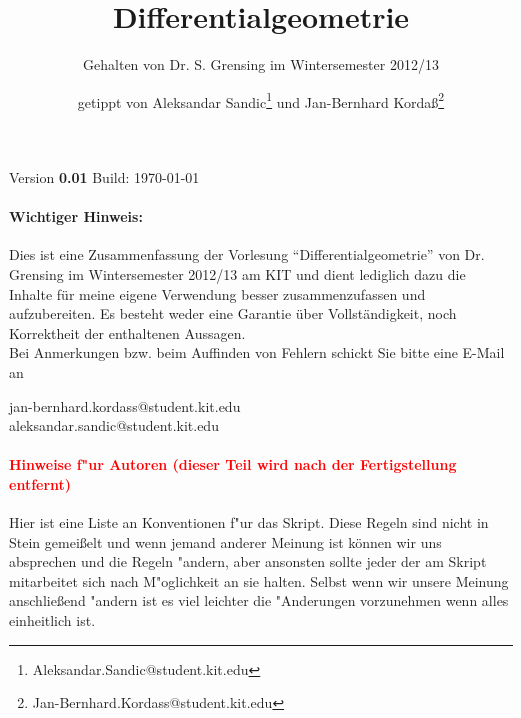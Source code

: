 \documentclass[paper=A4, twoside, chapterprefix=true, bibliography=totoc, headsepline]{scrbook}
\title{Differentialgeometrie}
\subtitle{Gehalten von Dr. S. Grensing im Wintersemester 2012/13}
\author{getippt von Aleksandar Sandic\thanks{Aleksandar.Sandic@student.kit.edu} und Jan-Bernhard Korda\ss\thanks{Jan-Bernhard.Kordass@student.kit.edu}}
\begin{document}

\maketitle

\setlength\parskip{0.6pt}
\tableofcontents

\setlength\parskip{\smallskipamount}

\vspace{0.5cm}

Version \textbf{0.01} \quad Build: \today

\paragraph{Wichtiger Hinweis:}
Dies ist eine Zusammenfassung der Vorlesung "`Differentialgeometrie"' von Dr. Grensing im Wintersemester 2012/13 am KIT und dient lediglich dazu die Inhalte für meine eigene Verwendung besser zusammenzufassen und aufzubereiten. Es besteht weder eine Garantie über Vollständigkeit, noch Korrektheit der enthaltenen Aussagen.\\

Bei Anmerkungen bzw. beim Auffinden von Fehlern schickt Sie bitte eine E-Mail an
\begin{center}
  jan-bernhard.kordass@student.kit.edu\\
  aleksandar.sandic@student.kit.edu
\end{center}

\paragraph{\textcolor{red}{Hinweise f"ur Autoren (dieser Teil wird nach der Fertigstellung entfernt)}}
Hier ist eine Liste an Konventionen f"ur das Skript. Diese Regeln sind nicht in Stein gemei\ss elt und wenn jemand anderer Meinung ist können wir uns absprechen und die Regeln "andern, aber ansonsten sollte jeder der am Skript mitarbeitet sich nach M"oglichkeit an sie halten. Selbst wenn wir unsere Meinung anschließend "andern ist es viel leichter die "Anderungen vorzunehmen wenn alles einheitlich ist.
\end{document}
